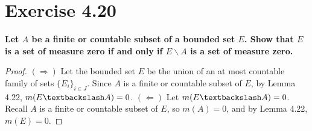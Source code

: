 \documentclass[paper=a4, fontsize=11pt]{scrartcl} %
\begin{document}
\section*{Exercise 4.20}
\boldmath
\textbf{Let $A$ be a finite or countable subset of a bounded set $E$.  Show that $E$ is a set of measure zero if and only if $E \backslash A$ is a set of measure zero.}
\unboldmath
\begin{proof}
$(\Rightarrow)$
\newline
Let the bounded set $E$ be the union of an at most countable family of sets $\{E_i\}_{i \in J}$.  Since $A$ is a finite or countable subset of $E$, by Lemma 4.22, $m(E \textbackslash A) = 0$.
\newline
$(\Leftarrow)$
Let $m(E \textbackslash A)= 0$.  Recall $A$ is a finite or countable subset of $E$, so $m(A) =0$, and by Lemma 4.22, $m(E) = 0$.
\end{proof}

\end{document}
